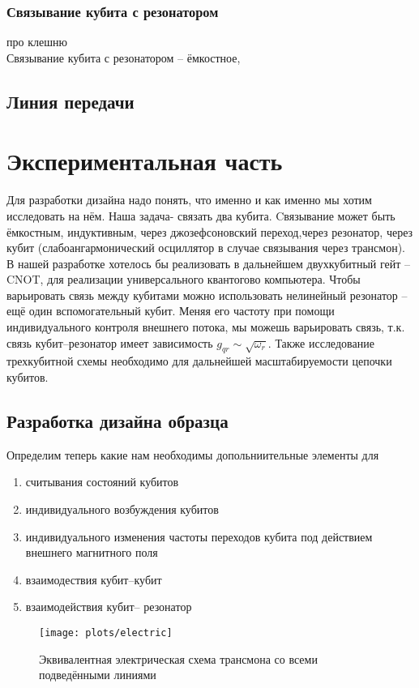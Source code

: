 \documentclass[12pt, a4paper, openany]{book}
\begin{document}
		\subsection{Связывание кубита с резонатором}
про клешню\cite{Sank2014}\\
Связывание кубита с резонатором -- ёмкостное,	

\newpage
	
	\section{Линия передачи}
















\chapter{Экспериментальная часть} \label{chap:exp}
Для разработки дизайна надо понять, что именно и как именно мы хотим исследовать на нём. Наша задача-
связать два кубита. Cвязывание может быть ёмкостным, индуктивным, через джозефсоновский переход,через резонатор\cite{Kelly2015}, через кубит (слабоангармонический  осциллятор в случае связывания через трансмон).
В нашей разработке хотелось бы реализовать в дальнейшем двухкубитный гейт -- CNOT, для реализации универсального квантогово компьютера. Чтобы варьировать связь между кубитами можно использовать нелинейный резонатор -- ещё один вспомогательный кубит. Меняя его частоту при помощи индивидуального контроля внешнего потока, мы можешь варьировать связь, т.к. связь кубит--резонатор имеет зависимость $g_{qr} \sim \sqrt{\omega_r}$. Также исследование трехкубитной схемы необходимо для дальнейшей масштабируемости цепочки кубитов.	
	\section{Разработка дизайна образца}
	Определим теперь какие нам необходимы допольниительные элементы для
	\begin{enumerate}
	\item считывания состояний кубитов
	\item индивидуального возбуждения кубитов
	\item индивидуального изменения частоты переходов кубита под действием внешнего магнитного поля
	\item взаимодествия кубит--кубит
	\item взаимодействия кубит-- резонатор
	\end{enumerate}
\begin{figure}[h]
		\begin{center}
\texttt{[image: plots/electric]}
\caption{Эквивалентная электрическая схема трансмона со всеми подведёнными линиями}
		\end{center}
		\label{fig:Xmon}
	\end{figure}
\end{document}
